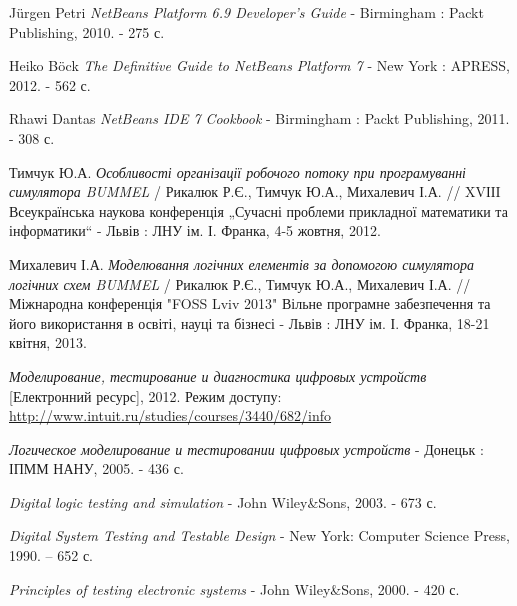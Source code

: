\documentclass[12pt,a4paper]{article}
\begin{document}
\begin{thebibliography}{9}



  Jürgen Petri \emph{NetBeans Platform 6.9 Developer's Guide}
     - Birmingham : Packt Publishing, 2010. - 275 с.

  Heiko Böck \emph{The Definitive Guide to NetBeans Platform 7}
     - New York : APRESS, 2012. - 562 с.

  Rhawi Dantas \emph{NetBeans IDE 7 Cookbook}
     - Birmingham : Packt Publishing, 2011. - 308 с.

  Тимчук Ю.А. \emph{Особливості організації робочого потоку при програмуванні симулятора BUMMEL}
    / Рикалюк Р.Є., Тимчук Ю.А., Михалевич І.А.
    // XVІІI Всеукраїнська наукова конференція „Сучасні проблеми прикладної математики та інформатики“
    - Львів : ЛНУ ім. І. Франка, 4-5 жовтня, 2012.

  Михалевич І.А. \emph{Моделювання логічних елементів за допомогою симулятора логічних схем BUMMEL}
    / Рикалюк Р.Є., Тимчук Ю.А., Михалевич І.А.
    // Міжнародна конференція "FOSS Lviv 2013" Вільне програмне забезпечення та його використання в освіті, науці та бізнесі
    - Львів : ЛНУ ім. І. Франка, 18-21 квітня, 2013.

  \emph{Моделирование, тестирование и диагностика цифровых устройств}
    [Електронний ресурс], 2012. Режим доступу:
    \url{http://www.intuit.ru/studies/courses/3440/682/info}

  \emph{Логическое моделирование и тестировании цифровых устройств}
     - Донецьк : ІПММ НАНУ, 2005. - 436 с.

  \emph{Digital logic testing and simulation}
     - John Wiley\&Sons, 2003. - 673 с.

  \emph{Digital System Testing and Testable Design}
     - New York: Computer Science Press, 1990. – 652 с.

  \emph{Principles of testing electronic systems}
     - John Wiley\&Sons, 2000. - 420 с.


\end{thebibliography}
\end{document}
